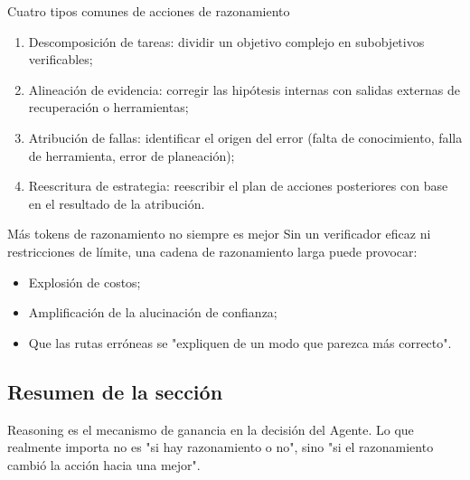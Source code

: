 \begin{knowledgebox}{Cuatro tipos comunes de acciones de razonamiento}
\begin{enumerate}
    \item Descomposición de tareas: dividir un objetivo complejo en subobjetivos verificables;
    \item Alineación de evidencia: corregir las hipótesis internas con salidas externas de recuperación o herramientas;
    \item Atribución de fallas: identificar el origen del error (falta de conocimiento, falla de herramienta, error de planeación);
    \item Reescritura de estrategia: reescribir el plan de acciones posteriores con base en el resultado de la atribución.
\end{enumerate}
\end{knowledgebox}

\begin{warningbox}{Más tokens de razonamiento no siempre es mejor}
Sin un verificador eficaz ni restricciones de límite, una cadena de razonamiento larga puede provocar:
\begin{itemize}
    \item Explosión de costos;
    \item Amplificación de la alucinación de confianza;
    \item Que las rutas erróneas se "expliquen de un modo que parezca más correcto".
\end{itemize}
\end{warningbox}

\subsection{Resumen de la sección}
Reasoning es el mecanismo de ganancia en la decisión del Agente. Lo que realmente importa no es "si hay razonamiento o no", sino "si el razonamiento cambió la acción hacia una mejor".
